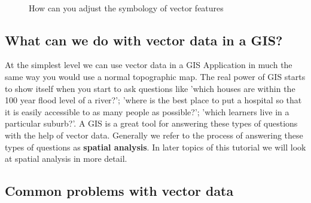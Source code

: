 \begin{figure}[htpb]
\centering
\caption{How can you adjust the symbology of vector features}
   \label{fig:symbology}
    \\
   \goodgap
\end{figure}

\newpage

\subsection{What can we do with vector data in a GIS?}

At the simplest level we can use vector data in a GIS Application in much the
same way you would use a normal topographic map. The real power of GIS starts
to show itself when you start to ask questions like 'which houses are within
the 100 year flood level of a river?'; 'where is the best place to put a
hospital so that it is easily accessible to as many people as possible?';
'which learners live in a particular suburb?'. A GIS is a great tool for
answering these types of questions with the help of vector data. Generally we
refer to the process of answering these types of questions as
\textbf{spatial analysis}. In later topics of this tutorial we will look at
spatial analysis in more detail.

\subsection{Common problems with vector data}

